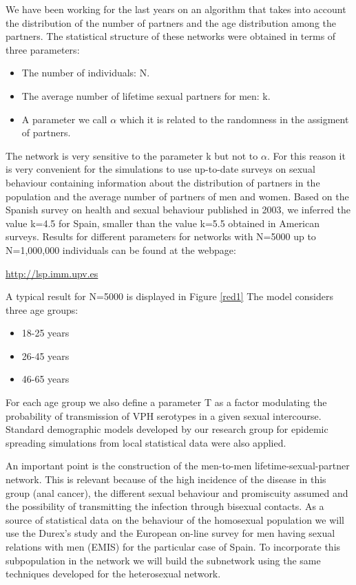We have been working for the last years on an algorithm that takes into account the distribution of the number of partners and the age distribution among the partners. The statistical structure of these networks were obtained in terms of three parameters:

\begin{itemize}
	\item The number of individuals: N.
	\item The average number of lifetime sexual partners for men: k.
	\item A parameter we call $\alpha$ which it is related to the randomness in the assigment of partners.
\end{itemize}

The network is very sensitive to the parameter k but not to $\alpha$. For this reason it is very convenient for the simulations to use up-to-date surveys on sexual behaviour containing information about the distribution of partners in the population and the average number of partners of men and women. Based on the Spanish survey on health and sexual behaviour published in 2003, we inferred the value k=4.5 for Spain, smaller than the value k=5.5 obtained in American surveys. Results for different parameters for networks with N=5000 up to N=1,000,000 individuals can be found at the webpage:

\url{http://lsp.imm.upv.es}

A typical result for N=5000 is displayed in Figure \ref{red1}
The model considers three age groups:
\begin{itemize}
	\item 18-25 years
	\item 26-45 years
	\item 46-65 years
\end{itemize}

For each age group we also define a parameter T as a factor modulating the probability of transmission of VPH serotypes in a given sexual intercourse.
Standard demographic models developed by our research group for epidemic spreading simulations from local statistical data were also applied.

An important point is the construction of the men-to-men lifetime-sexual-partner network. This is relevant because of the high incidence of the disease in this group (anal cancer), the different sexual behaviour and promiscuity assumed and the possibility of transmitting the infection through bisexual contacts. 
As a source of statistical data on the behaviour of the homosexual population we will use the Durex's study and the European on-line survey for men having sexual relations with men (EMIS) for the particular case of Spain.
To incorporate this subpopulation in the network we will build the subnetwork using the same techniques developed for the heterosexual network.

